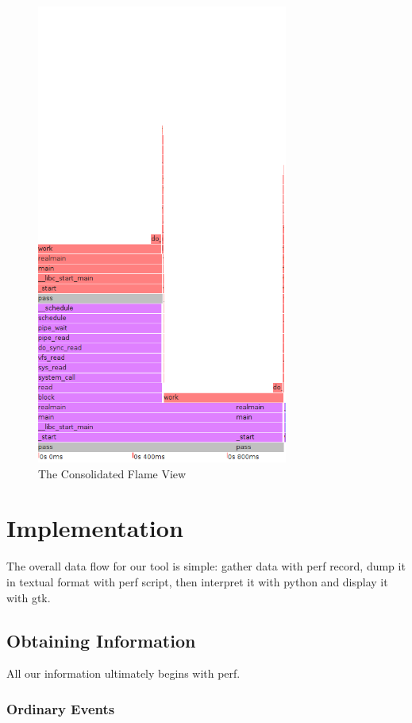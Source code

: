 \documentclass[10pt]{article}
\begin{document}
\begin{figure}[h]
\includegraphics[width=3.25in]{passcons}
\caption{The Consolidated Flame View}
\end{figure}

\section{Implementation}

The overall data flow for our tool is simple: gather data with perf record, dump it in textual format with perf script, then interpret it with python and display it with gtk.

\subsection{Obtaining Information}

All our information ultimately begins with perf.

\subsubsection{Ordinary Events}
\end{document}
